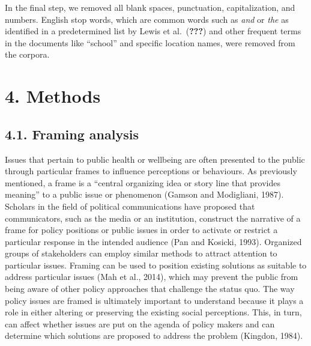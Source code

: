 \documentclass[]{elsarticle} %
\begin{document}
In the final step, we removed all blank spaces, punctuation,
capitalization, and numbers. English stop words, which are common words
such as \emph{and} or \emph{the} as identified in a predetermined list
by Lewis et al.~({\textbf{???}}) and other frequent terms in the
documents like ``school'' and specific location names, were removed from
the corpora.

\hypertarget{methods}{%
\section{4. Methods}\label{methods}}

\hypertarget{framing-analysis}{%
\subsection{4.1. Framing analysis}\label{framing-analysis}}

Issues that pertain to public health or wellbeing are often presented to
the public through particular frames to influence perceptions or
behaviours. As previously mentioned, a frame is a ``central organizing
idea or story line that provides meaning'' to a public issue or
phenomenon (Gamson and Modigliani, 1987). Scholars in the field of
political communications have proposed that communicators, such as the
media or an institution, construct the narrative of a frame for policy
positions or public issues in order to activate or restrict a particular
response in the intended audience (Pan and Kosicki, 1993). Organized
groups of stakeholders can employ similar methods to attract attention
to particular issues. Framing can be used to position existing solutions
as suitable to address particular issues (Mah et al., 2014), which may
prevent the public from being aware of other policy approaches that
challenge the status quo. The way policy issues are framed is ultimately
important to understand because it plays a role in either altering or
preserving the existing social perceptions. This, in turn, can affect
whether issues are put on the agenda of policy makers and can determine
which solutions are proposed to address the problem (Kingdon, 1984).
\end{document}

